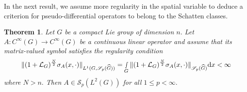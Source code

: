 \documentclass[12pt, reqno]{amsart}
\newtheorem{theorem}{Theorem}[section]
\theoremstyle{definition}
\theoremstyle{remark}
\numberwithin{equation}{section}
\begin{document}
In the next result, we assume more regularity in the spatial variable to deduce a criterion for pseudo-differential operators to belong to the Schatten classes.
\begin{theorem}\label{Michael:criterion:2}Let $G$ be a compact Lie group of dimension $n.$ Let $A:C^\infty(G)\rightarrow C^\infty(G) $ be a continuous linear operator and assume that its matrix-valued symbol satisfies the regularity condition
\begin{equation}
    \Vert (1+\mathcal{L}_G)^{\frac{N}{2}}\sigma_A(x,\cdot)\Vert_{L^1(G,\mathscr{S}_p(\widehat{G}))}=\smallint\limits_G\Vert (1+\mathcal{L}_G)^{\frac{N}{2}}\sigma_A(x,\cdot)\Vert_{\mathscr{S}_p(\widehat{G})}\textnormal{d}x<\infty
\end{equation}where $N>n.$ Then $A\in \mathscr{S}_{p}(L^2(G))$ for all $1\leq p<\infty.$
\end{theorem}
\end{document}
